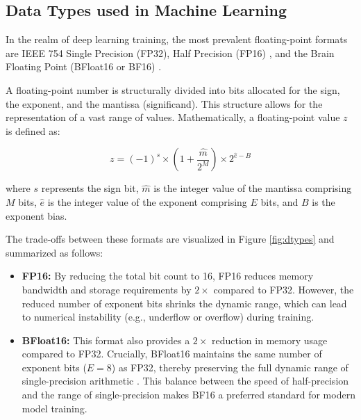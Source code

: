 \subsection{Data Types used in Machine Learning}


In the realm of deep learning training, the most prevalent floating-point formats are IEEE 754 Single Precision (FP32), Half Precision (FP16) \cite{micikevicius2017mixed}, and the Brain Floating Point (BFloat16 or BF16) \cite{kalamkar2019bfloat16}.

A floating-point number is structurally divided into bits allocated for the sign, the exponent, and the mantissa (significand). This structure allows for the representation of a vast range of values. Mathematically, a floating-point value $z$ is defined as:

\begin{equation}
  z = (-1)^s \times \left(1 + \frac{\hat{m}}{2^M}\right) \times 2^{\hat{e}-B}
  \label{eq:float}
\end{equation}

\noindent where $s$ represents the sign bit, $\hat{m}$ is the integer value of the mantissa comprising $M$ bits, $\hat{e}$ is the integer value of the exponent comprising $E$ bits, and $B$ is the exponent bias.

The trade-offs between these formats are visualized in Figure \ref{fig:dtypes} and summarized as follows:

\begin{itemize}
  \item \textbf{FP16:} By reducing the total bit count to 16, FP16 reduces memory bandwidth and storage requirements by $2\times$ compared to FP32. However, the reduced number of exponent bits shrinks the dynamic range, which can lead to numerical instability (e.g., underflow or overflow) during training.
  \item \textbf{BFloat16:} This format also provides a $2\times$ reduction in memory usage compared to FP32. Crucially, BFloat16 maintains the same number of exponent bits ($E=8$) as FP32, thereby preserving the full dynamic range of single-precision arithmetic \cite{kalamkar2019bfloat16}. This balance between the speed of half-precision and the range of single-precision makes BF16 a preferred standard for modern model training.
\end{itemize}

